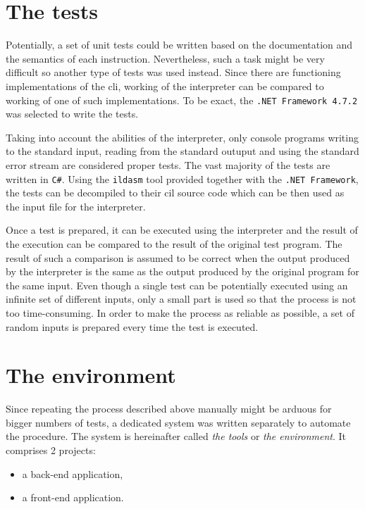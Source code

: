\documentclass[declaration,shortabstract,english,mgr]{iithesis}
\begin{document}
\section{The tests}

Potentially, a set of unit tests could be written based on the documentation and the semantics of each instruction. Nevertheless, such a task might be very difficult so another type of tests was used instead. Since there are functioning implementations of the \acrshort{cli}, working of the interpreter can be compared to working of one of such implementations. To be exact, the \texttt{.NET Framework 4.7.2} was selected to write the tests.

Taking into account the abilities of the interpreter, only console programs writing to the standard input, reading from the standard outuput and using the standard error stream are considered proper tests. The vast majority of the tests are written in \texttt{C\#}. Using the \texttt{ildasm} tool provided together with the \texttt{.NET Framework}, the tests can be decompiled to their \acrshort{cil} source code which can be then used as the input file for the interpreter. 

Once a test is prepared, it can be executed using the interpreter and the result of the execution can be compared to the result of the original test program. The result of such a comparison is assumed to be correct when the output produced by the interpreter is the same as the output produced by the original program for the same input. Even though a single test can be potentially executed using an infinite set of different inputs, only a small part is used so that the process is not too time-consuming. In order to make the process as reliable as possible, a set of random inputs is prepared every time the test is executed.

\section{The environment}
\label{sec:environment}

Since repeating the process described above manually might be arduous for bigger numbers of tests, a dedicated system was written separately to automate the procedure. The system is hereinafter called \textit{the tools} or \textit{the environment}. It comprises 2 projects:
\begin{itemize}
	\item{a back-end application,}
	\item{a front-end application.}
\end{itemize}
\end{document}
